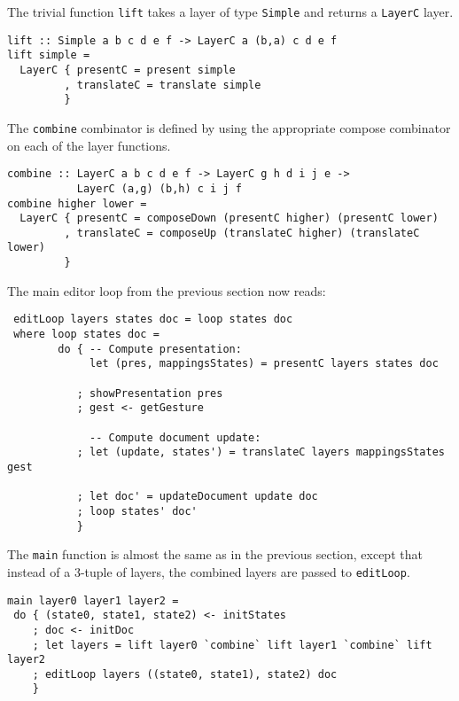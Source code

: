 The trivial function \texttt{lift} takes a layer of type \texttt{Simple} and returns a \texttt{LayerC} layer.

\begin{small}
\begin{verbatim}
lift :: Simple a b c d e f -> LayerC a (b,a) c d e f
lift simple = 
  LayerC { presentC = present simple
         , translateC = translate simple
         }
\end{verbatim}
\end{small}

The \texttt{combine} combinator is defined by using the appropriate compose combinator on each of the layer functions. 

\begin{small}
\begin{verbatim}
combine :: LayerC a b c d e f -> LayerC g h d i j e -> 
           LayerC (a,g) (b,h) c i j f
combine higher lower =
  LayerC { presentC = composeDown (presentC higher) (presentC lower)
         , translateC = composeUp (translateC higher) (translateC lower)
         }
\end{verbatim}
\end{small}


 The main editor loop from the previous section now reads:
 
 \begin{small}
 \begin{verbatim}
 editLoop layers states doc = loop states doc
 where loop states doc = 
        do { -- Compute presentation:
             let (pres, mappingsStates) = presentC layers states doc
           
           ; showPresentation pres
           ; gest <- getGesture
 
             -- Compute document update:
           ; let (update, states') = translateC layers mappingsStates gest
       
           ; let doc' = updateDocument update doc
           ; loop states' doc'
           }
\end{verbatim}
\end{small}

The \texttt{main} function is almost the same as in the previous section, except that instead of a 3-tuple of layers, the combined layers are passed to \texttt{editLoop}. 

\begin{small}
\begin{verbatim}
main layer0 layer1 layer2 = 
 do { (state0, state1, state2) <- initStates
    ; doc <- initDoc 
    ; let layers = lift layer0 `combine` lift layer1 `combine` lift  layer2
    ; editLoop layers ((state0, state1), state2) doc
    }
\end{verbatim}
\end{small}


